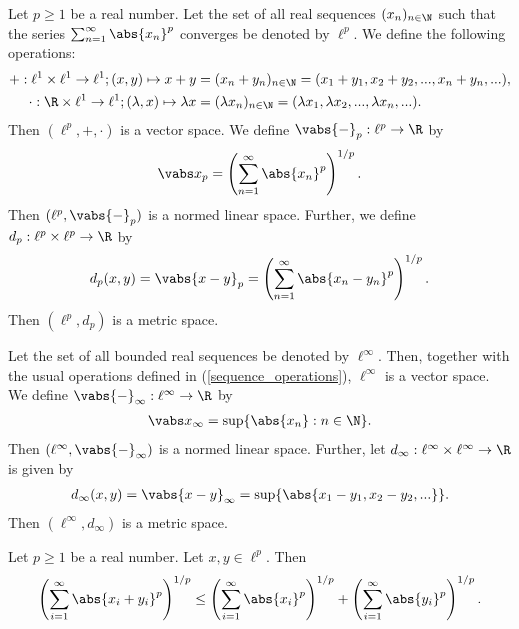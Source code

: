 \documentclass{article}
\begin{document}
\begin{lemma}
	Let $p\geq 1$ be a real number.
	Let the set of all real sequences $(x_n)_{n\in\N}$ such that the series
	$\sum_{n=1}^\infty \abs{x_n}^p$ converges be denoted by $\ell^p$.
	We define the following operations:
	\begin{align}
		\label{sequence_operations}
		+:\ell^1\times \ell^1\to \ell^1;(x,y)\mapsto x+y            & =(x_n+y_n)_{n\in\N}=(x_1+y_1,x_2+y_2,...,x_n+y_n,...),                 \\
		\cdot:\R\times \ell^1\to \ell^1;(\lambda,x)\mapsto\lambda x & =(\lambda x_n)_{n\in\N}=(\lambda x_1,\lambda x_2,...,\lambda x_n,...).
	\end{align}
	Then $(\ell^p,+,\cdot)$ is a vector space.
	We define $\vabs{-}_p:\ell^p\to\R$ by
	\begin{align*}
		\vabs x_p = \left(\sum_{n=1}^\infty \abs{x_n}^p\right)^{1/p}.
	\end{align*}
	Then $(\ell^p, \vabs{-}_p)$ is a normed linear space.
	Further, we define $d_p:\ell^p\times \ell^p\to\R$ by
	\begin{align*}
		d_p(x,y)=\vabs{x-y}_p=\left(\sum_{n=1}^\infty\abs{x_n-y_n}^p\right)^{1/p}.
	\end{align*}
	Then $(\ell^p,d_p)$ is a metric space.
\end{lemma}

\begin{lemma}
	Let the set of all bounded real sequences be denoted by $\ell^\infty$. Then, together with
	the usual operations defined in (\ref{sequence_operations}), $\ell^\infty$ is a vector space.
	We define $\vabs{-}_\infty:\ell^\infty\to\R$ by
	\begin{align*}
		\vabs x_\infty = \sup\{\abs{x_n}:n\in\N\}.
	\end{align*}
	Then $(\ell^\infty,\vabs{-}_\infty)$ is a normed linear space.
	Further, let $d_\infty:\ell^\infty\times \ell^\infty\to\R$ is given by
	\begin{align*}
		d_\infty(x,y)=\vabs{x-y}_\infty = \sup\{\abs{x_1-y_1,x_2-y_2,...}\}.
	\end{align*}
	Then $(\ell^\infty, d_\infty)$ is a metric space.
\end{lemma}

\begin{lemma}
	Let $p\geq 1$ be a real number. Let $x,y\in \ell^p$. Then
	\begin{align*}
		\left(\sum_{i=1}^\infty \abs{x_i+y_i}^p\right)^{1/p}
		\leq \left(\sum_{i=1}^\infty \abs{x_i}^p\right)^{1/p}
		+ \left(\sum_{i=1}^\infty \abs{y_i}^p\right)^{1/p}.
	\end{align*}
\end{lemma}
\end{document}
